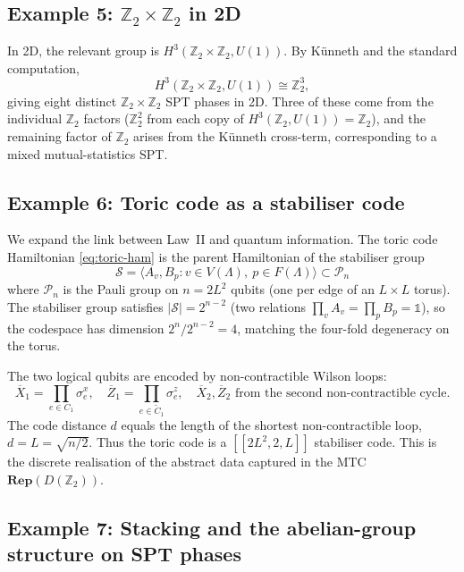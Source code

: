 \documentclass[12pt]{article}
\theoremstyle{plain}
\theoremstyle{definition}
\theoremstyle{remark}
\newcommand{\Rep}{\mathbf{Rep}}
\begin{document}
\subsection{\texorpdfstring{Example 5: $\mathbb{Z}_{2}\times\mathbb{Z}_{2}$ in 2D}{Example 5: Z2 x Z2 in 2D}}
\label{ex:z2z2-2d}

In 2D, the relevant group is $H^{3}(\mathbb{Z}_{2}\times\mathbb{Z}_{2},U(1))$. By
K\"unneth and the standard computation,
\[
H^{3}(\mathbb{Z}_{2}\times\mathbb{Z}_{2},U(1)) \cong \mathbb{Z}_{2}^{3},
\]
giving eight distinct $\mathbb{Z}_{2}\times\mathbb{Z}_{2}$ SPT phases in 2D. Three of
these come from the individual $\mathbb{Z}_{2}$ factors ($\mathbb{Z}_{2}^{2}$ from each
copy of $H^{3}(\mathbb{Z}_{2},U(1))=\mathbb{Z}_{2}$), and the remaining factor of
$\mathbb{Z}_{2}$ arises from the K\"unneth cross-term, corresponding to a mixed
mutual-statistics SPT.

\subsection{Example 6: Toric code as a stabiliser code}
\label{ex:toric-stab}

We expand the link between Law~II and quantum information. The toric code Hamiltonian
\cref{eq:toric-ham} is the parent Hamiltonian of the stabiliser group
\[
\mathcal{S} = \langle A_{v}, B_{p} : v\in V(\Lambda),\ p\in F(\Lambda)\rangle
\subset\mathcal{P}_{n}
\]
where $\mathcal{P}_{n}$ is the Pauli group on $n=2L^{2}$ qubits (one per edge of an
$L\times L$ torus). The stabiliser group satisfies $|\mathcal{S}|=2^{n-2}$ (two relations
$\prod_{v}A_{v}=\prod_{p}B_{p}=\mathbb{1}$), so the codespace has dimension
$2^{n}/2^{n-2}=4$, matching the four-fold degeneracy on the torus.

The two logical qubits are encoded by non-contractible Wilson loops:
\[
\overline{X}_{1} = \prod_{e\in C_{1}}\sigma^{x}_{e},\quad
\overline{Z}_{1} = \prod_{e\in \widetilde C_{1}}\sigma^{z}_{e},\quad
\overline{X}_{2}, \overline{Z}_{2} \text{ from the second non-contractible cycle.}
\]
The code distance $d$ equals the length of the shortest non-contractible loop,
$d=L=\sqrt{n/2}$. Thus the toric code is a $[[2L^{2},2,L]]$ stabiliser code. This is the
discrete realisation of the abstract data captured in the MTC $\Rep(D(\mathbb{Z}_{2}))$.

\subsection{Example 7: Stacking and the abelian-group structure on SPT phases}
\label{ex:stacking}
\end{document}
